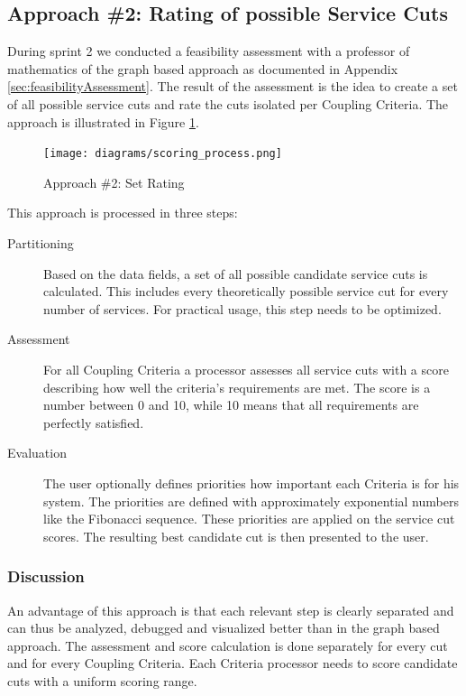 \subsection{Approach \#2: Rating of possible Service Cuts}

During sprint 2 we conducted a feasibility assessment with a professor of mathematics of the graph based approach as documented in Appendix \ref{sec:feasibilityAssessment}. The result of the assessment is the idea to create a set of all possible service cuts and rate the cuts isolated per Coupling Criteria. The approach is illustrated in Figure \ref{fig:setProcess}.

\begin{figure}[H]
	\begin{center}
		\texttt{[image: diagrams/scoring\_process.png]}
	\end{center}
	\caption{Approach \#2: Set Rating}
	\label{fig:setProcess}
\end{figure}

This approach is processed in three steps:

\begin{description}
	\item[Partitioning] Based on the data fields, a set of all possible candidate service cuts is calculated. This includes every theoretically possible service cut for every number of services. For practical usage, this step needs to be optimized. 
	\item[Assessment] For all Coupling Criteria a processor assesses all service cuts with a score describing how well the criteria's requirements are met. The score is a number between 0 and 10, while 10 means that all requirements are perfectly satisfied. 
	\item[Evaluation] The user optionally defines priorities how important each Criteria is for his system. The priorities are defined with approximately exponential numbers like the Fibonacci sequence. These priorities are applied on the service cut scores. The resulting best candidate cut is then presented to the user.
\end{description}

\subsubsection{Discussion}

An advantage of this approach is that each relevant step is clearly separated and can thus be analyzed, debugged and visualized better than in the graph based approach. The assessment and score calculation is done separately for every cut and for every Coupling Criteria. Each Criteria processor needs to score candidate cuts with a uniform scoring range. 

